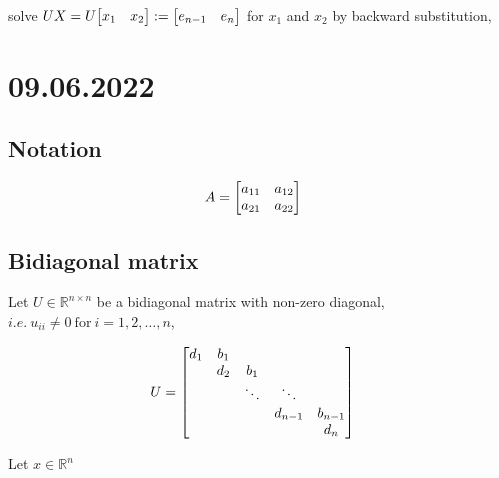 \documentclass[11pt]{article}
\newcommand{\triu}{\mathop{\mathrm{triu}}}
\newcommand{\T}{\mathrm{T}}
\begin{document}
\noindent solve $UX = U\mqty[x_{1} & x_{2}] := \mqty[e_{n-1} & e_{n}]$ for $x_{1}$ and $x_{2}$ by backward substitution,


\section{09.06.2022}

\subsection{Notation}



\begin{align*}
    A &= \mqty[
        a_{11} & a_{12} \\
        a_{21} & a_{22} 
        ]
\end{align*}


\subsection{Bidiagonal matrix}







\noindent Let $U \in \mathbb{R}^{n \times n}$ be a bidiagonal matrix with non-zero diagonal, 
$i.e. \ u_{ii} \neq 0 \ \text{for} \ i = 1, 2, \ldots , n$,

\begin{align*}
    U &= \mqty[
        d_{1} & b_{1} &   &   &  \\
          & d_{2} & b_{1} &   &  \\
          &   & \ddots & \ddots &  \\
          &   &   & d_{n-1} & b_{n-1}\\
          &   &   &   & d_{n}
        ]
\end{align*}


\noindent Let $x \in \mathbb{R}^{n}$
\end{document}

